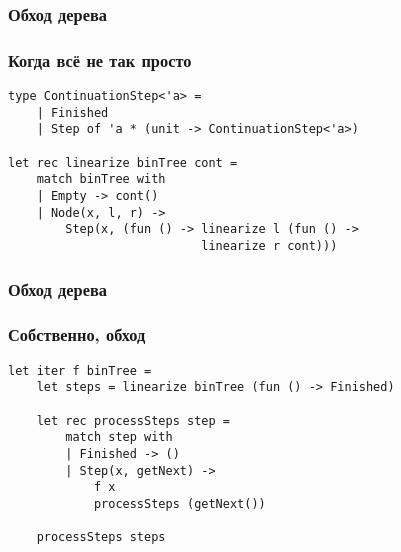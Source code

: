 \documentclass[xetex,mathserif,serif]{beamer}
\begin{document}
    \begin{frame}[fragile]
        \frametitle{Обход дерева}
        \frametitle{Когда всё не так просто}
        \begin{verbatim}
type ContinuationStep<'a> =
    | Finished
    | Step of 'a * (unit -> ContinuationStep<'a>)

let rec linearize binTree cont =
    match binTree with
    | Empty -> cont()
    | Node(x, l, r) ->
        Step(x, (fun () -> linearize l (fun () -> 
                           linearize r cont)))
        \end{verbatim}
    \end{frame}

    \begin{frame}[fragile]
        \frametitle{Обход дерева}
        \frametitle{Собственно, обход}
        \begin{verbatim}
let iter f binTree =
    let steps = linearize binTree (fun () -> Finished)

    let rec processSteps step =
        match step with
        | Finished -> ()
        | Step(x, getNext) -> 
            f x
            processSteps (getNext())
    
    processSteps steps
        \end{verbatim}
    \end{frame}
\end{document}
